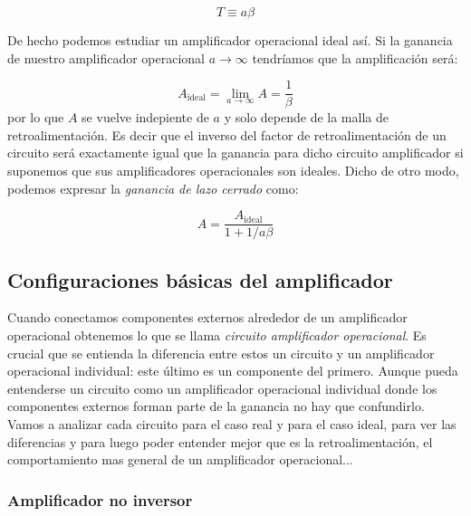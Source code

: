 \documentclass[11pt]{article} %
\begin{document}
\begin{equation}
T \equiv a \beta
\end{equation}

De hecho podemos estudiar un amplificador operacional ideal así. Si la ganancia de nuestro amplificador operacional $a \rightarrow \infty$ tendríamos que la amplificación será:

\begin{equation}
A_{\mathrm{ideal}} = \lim_{a \rightarrow \infty} A = \dfrac{1}{\beta}
\end{equation}
por lo que $A$ se vuelve indepiente de $a$ y solo depende de la malla de retroalimentación. Es decir que el inverso del factor de retroalimentación de un circuito será exactamente igual que la ganancia para dicho circuito amplificador si suponemos que sus amplificadores operacionales son ideales. Dicho de otro modo, podemos expresar la \textit{ganancia de lazo cerrado} como:

\begin{equation}
A = \dfrac{A_{\mathrm{ideal}}}{1+1/a\beta}
\end{equation}


\subsection{Configuraciones básicas del amplificador \label{Subsec:1.3}} 

Cuando conectamos componentes externos alrededor de un amplificador operacional obtenemos lo que se llama \textit{circuito amplificador operacional}. Es crucial que se entienda la diferencia entre estos un circuito y un amplificador operacional individual: este último es un componente del primero. Aunque pueda entenderse un circuito como un amplificador operacional individual donde los componentes externos forman parte de la ganancia no hay que confundirlo. \\

Vamos a analizar cada circuito para el caso real y para el caso ideal, para ver las diferencias y para luego poder entender mejor que es la retroalimentación, el comportamiento mas general de un amplificador operacional...

\subsubsection{Amplificador no inversor}
\end{document}
